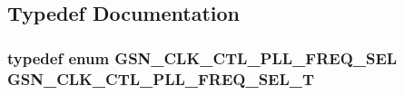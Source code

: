 \subsection{Typedef Documentation}
\hypertarget{a00477_ac0f1ee78197c9b51f46253d4b8eefc02}{
\subsubsection[{GSN\_\-CLK\_\-CTL\_\-PLL\_\-FREQ\_\-SEL\_\-T}]{\setlength{\rightskip}{0pt plus 5cm}typedef enum {\bf GSN\_\-CLK\_\-CTL\_\-PLL\_\-FREQ\_\-SEL} {\bf GSN\_\-CLK\_\-CTL\_\-PLL\_\-FREQ\_\-SEL\_\-T}}}
\label{a00477_ac0f1ee78197c9b51f46253d4b8eefc02}


